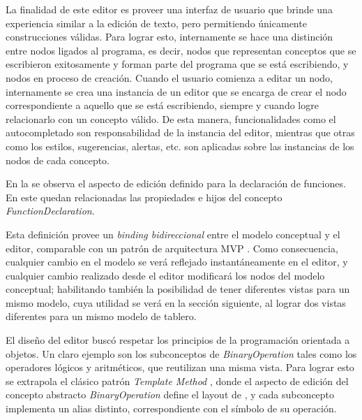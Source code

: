 La finalidad de este editor es proveer una interfaz de usuario que brinde una experiencia similar a la edición de texto, pero permitiendo únicamente construcciones válidas. Para lograr esto, internamente se hace una distinción entre nodos ligados al programa, es decir, nodos que representan conceptos que se escribieron exitosamente y forman parte del programa que se está escribiendo, y nodos en proceso de creación. 
Cuando el usuario comienza a editar un nodo, internamente se crea una instancia de un editor que se encarga de crear el nodo correspondiente a aquello que se está escribiendo, siempre y cuando logre relacionarlo con un concepto válido. 
De esta manera, funcionalidades como el autocompletado son responsabilidad de la instancia del editor, mientras que otras como los estilos, sugerencias, alertas, etc. son aplicadas sobre las instancias de los nodos de cada concepto.


En la  se observa el aspecto de edición definido para la declaración de funciones. En este quedan relacionadas las propiedades e hijos del concepto \textit{FunctionDeclaration}. 


Esta definición provee un \textit{binding bidireccional} entre el modelo conceptual y el editor, comparable con un patrón de arquitectura MVP  . Como consecuencia, cualquier cambio en el modelo se verá reflejado instantáneamente en el editor, y cualquier cambio realizado desde el editor modificará los nodos del modelo conceptual; habilitando también la posibilidad de tener diferentes vistas para un mismo modelo, cuya utilidad se verá en la sección siguiente, al lograr dos vistas diferentes para un mismo modelo de tablero.



El diseño del editor buscó respetar los principios de la programación orientada a objetos. Un claro ejemplo son los subconceptos de \textit{BinaryOperation} tales como los operadores lógicos y aritméticos, que reutilizan una misma vista. Para lograr esto se extrapola el clásico patrón \textit{Template Method} \cite{Gamma}, donde el aspecto de edición del concepto abstracto \textit{BinaryOperation} define el layout de , y cada subconcepto implementa un alias distinto, correspondiente con el símbolo de su operación.

